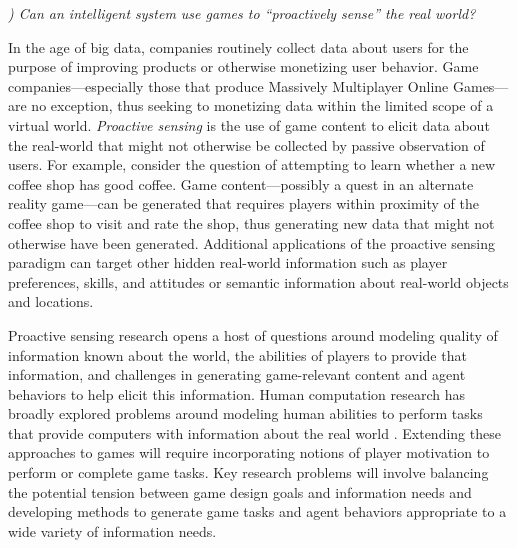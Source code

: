 \documentclass[conference]{IEEEtran}
\newcounter{questionno}
\newcommand{\mytodo}[1]{\textbf{[[#1]]}}
\newcommand{\subsubsectionx}[1]{{\em {\arabic{questionno}) #1}}
	\addtocounter{questionno}{1}
	}
\begin{document}


\subsubsectionx{Can an intelligent system use games to ``proactively sense'' the real world?}
%
In the age of big data, companies routinely collect data about users for the purpose of improving products or otherwise monetizing user behavior. 
Game companies---especially those that produce Massively Multiplayer Online Games---are no exception, thus seeking to monetizing data within the limited scope of a virtual world.
{\em Proactive sensing} is the use of game content to elicit data about the real-world that might not otherwise be collected by passive observation of users.
%
For example, consider the question of attempting to learn whether a new coffee shop has good coffee.
Game content---possibly a quest in an alternate reality game---can be generated that requires players within proximity of the coffee shop to visit and rate the shop, thus generating new data that might not otherwise have been generated.
Additional applications of the proactive sensing paradigm can target other hidden real-world information such as player preferences, skills, and attitudes or semantic information about real-world objects and locations.

Proactive sensing research opens a host of questions around modeling quality of information known about the world, the abilities of players to provide that information, and challenges in generating game-relevant content and agent behaviors to help elicit this information. 
Human computation research has broadly explored problems around modeling human abilities to perform tasks that provide computers with information about the real world \cite{law2011:hcomp-book}. 
Extending these approaches to games will require incorporating notions of player motivation to perform or complete game tasks.
Key research problems will involve balancing the potential tension between game design goals and information needs and developing methods to generate game tasks and agent behaviors appropriate to a wide variety of information needs.
\end{document}

